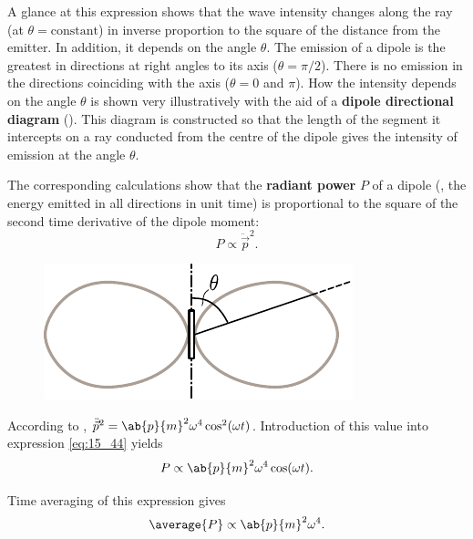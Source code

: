 \noindent
A glance at this expression shows that the wave intensity changes along the ray (at $\theta = \text{constant}$) in inverse proportion to the square of the distance from the emitter.
In addition, it depends on the angle $\theta$.
The emission of a dipole is the greatest in directions at right angles to its axis ($\theta = \pi/2$).
There is no emission in the directions coinciding with the axis ($\theta = 0$ and $\pi$).
How the intensity depends on the angle $\theta$ is shown very illustratively with the aid of a \textbf{dipole directional diagram} ().
This diagram is constructed so that the length of the segment it intercepts on a ray conducted from the
centre of the dipole gives the intensity of emission at the angle $\theta$.

The corresponding calculations show that the \textbf{radiant power} $P$ of a dipole (\ie, the energy emitted in all directions in unit time) is
proportional to the square of the second time derivative of the dipole moment:
\begin{equation}\label{eq:15_44}
    P \propto \ddot{\vec{p}}^2.
\end{equation}

\begin{figure}[!htb]
	\begin{center}
		\includegraphics[scale=1]{figures/ch_15/fig_15_7.pdf}
		\caption[]{}
		\label{fig:15_7}
	\end{center}
	\vspace{-0.8cm}
\end{figure}

\noindent
According to , $\ddot{\vec{p}}^2=\ab{p}{m}^2\omega^4\cos^2(\omega t)$.
Introduction of this value into expression \eqref{eq:15_44} yields
\begin{equation}\label{eq:15_45}
    P \propto \ab{p}{m}^2 \omega^4 \cos(\omega t).
\end{equation}

\noindent
Time averaging of this expression gives
\begin{equation}\label{eq:15_46}
    \average{P} \propto \ab{p}{m}^2 \omega^4.
\end{equation}

